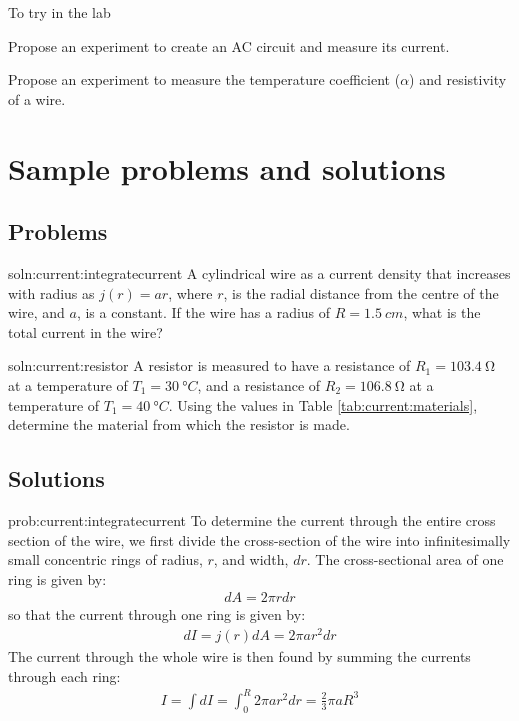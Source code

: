 \begin{chapteractivity}{To try in the lab}
{ 
\item Propose an experiment to create an AC circuit and measure its current.
\item Propose an experiment to measure the temperature coefficient ($\alpha$) and resistivity of a wire.
}
\end{chapteractivity}

\newpage
\section{Sample problems and solutions}



\subsection{Problems}
\begin{problem}{soln:current:integratecurrent}{\label{prob:current:integratecurrent}}
A cylindrical wire as a current density that increases with radius as $j(r) = ar$, where $r$, is the radial distance from the centre of the wire, and $a$, is a constant. If the wire has a radius of $R = \SI{1.5}{cm}$, what is the total current in the wire?
\end{problem}


\begin{problem}{soln:current:resistor}{\label{prob:current:resistor} A resistor is measured to have a resistance of $R_1=\SI{103.4}{\ohm}$ at a temperature of $T_1=\SI{30}{\degree C}$, and a resistance of $R_2=\SI{106.8}{\ohm}$ at a temperature of $T_1=\SI{40}{\degree C}$. Using the values in Table \ref{tab:current:materials}, determine the material from which the resistor is made.
}
\end{problem}


\newpage
\subsection{Solutions}
\begin{solution}{prob:current:integratecurrent}\label{soln:current:integratecurrent}
To determine the current through the entire cross section of the wire, we first divide the cross-section of the wire into infinitesimally small concentric rings of radius, $r$, and width, $dr$. The cross-sectional area of one ring is given by:
\begin{align*}
dA = 2\pi r dr
\end{align*}
so that the current through one ring is given by:
\begin{align*}
dI = j(r) dA = 2\pi a r^2 dr
\end{align*}
The current through the whole wire is then found by summing the currents through each ring:
\begin{align*}
I=\int dI = \int_0^R 2\pi a r^2 dr=\frac{2}{3}\pi aR^3
\end{align*}
\end{solution}

